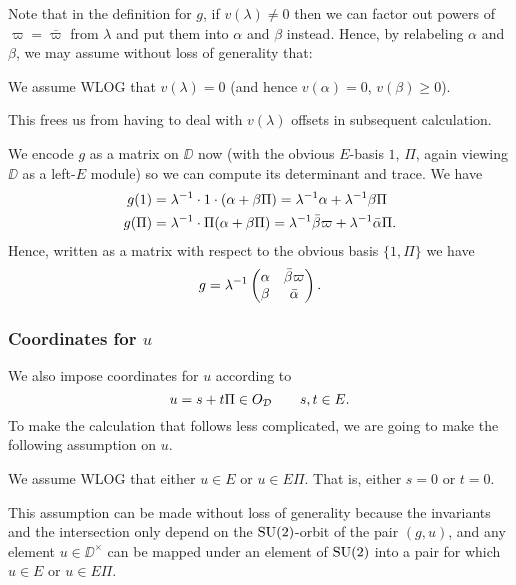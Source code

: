 Note that in the definition for $g$, if $v(\lambda) \neq 0$
then we can factor out powers of $\varpi = \bar\varpi$ from $\lambda$
and put them into $\alpha$ and $\beta$ instead.
Hence, by relabeling $\alpha$ and $\beta$, we may assume without loss of generality that:
\begin{assume}
  We assume WLOG that $v(\lambda) = 0$ (and hence $v(\alpha)=0$, $v(\beta) \ge 0$).
\end{assume}
This frees us from having to deal with $v(\lambda)$ offsets in subsequent calculation.

We encode $g$ as a matrix on $\DD$ now (with the obvious $E$-basis $1$, $\Pi$,
again viewing $\DD$ as a left-$E$ module)
so we can compute its determinant and trace.
We have
\begin{align*}
  g(1) &= \lambda^{-1} \cdot 1 \cdot (\alpha + \beta \Pi)
    = \lambda^{-1} \alpha + \lambda^{-1} \beta \Pi \\
  g(\Pi) &= \lambda^{-1} \cdot \Pi (\alpha + \beta \Pi)
    = \lambda^{-1} \bar\beta \varpi + \lambda^{-1} \bar\alpha \Pi.
\end{align*}
Hence, written as a matrix with respect to the obvious basis $\{1, \Pi\}$ we have
\[ g = \lambda^{-1} \begin{pmatrix}
  \alpha & \bar\beta \varpi \\
  \beta &  \bar\alpha
  \end{pmatrix}. \]

\subsubsection{Coordinates for $u$}
We also impose coordinates for $u$ according to
\[ u = s + t \Pi \in O_\mathcal D \qquad s, t \in E. \]
To make the calculation that follows less complicated,
we are going to make the following assumption on $u$.
\begin{assume}
  We assume WLOG that either $u \in E$ or $u \in E \Pi$.
  That is, either $s = 0$ or $t = 0$.
  \label{assume:st_zero}
\end{assume}
This assumption can be made without loss of generality because
the invariants and the intersection only depend
on the $\operatorname{SU}(2)$-orbit of the pair $(g,u)$,
and any element $u \in \DD^\times$ can be mapped under an element of $\operatorname{SU}(2)$
into a pair for which $u \in E$ or $u \in E \Pi$.

